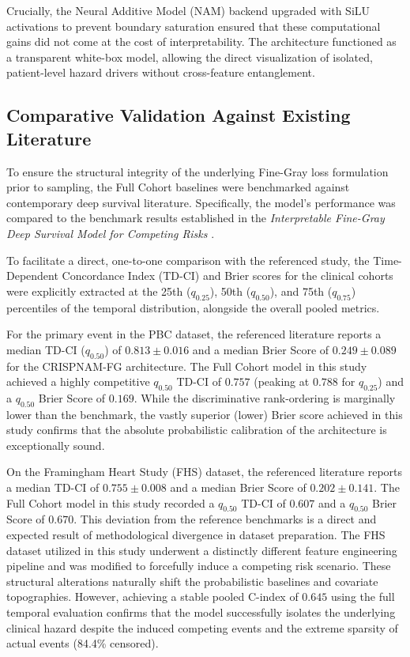 \documentclass[a4paper,twoside,12pt]{report}
\begin{document}
Crucially, the Neural Additive Model (NAM) backend upgraded with SiLU activations to prevent boundary saturation ensured that these computational gains did not come at the cost of interpretability. The architecture functioned as a transparent white-box model, allowing the direct visualization of isolated, patient-level hazard drivers without cross-feature entanglement.

\subsection{Comparative Validation Against Existing Literature}

To ensure the structural integrity of the underlying Fine-Gray loss formulation prior to sampling, the Full Cohort baselines were benchmarked against contemporary deep survival literature. Specifically, the model's performance was compared to the benchmark results established in the \textit{Interpretable Fine-Gray Deep Survival Model for Competing Risks} \citep{InterpretableFineGray2025}. 

To facilitate a direct, one-to-one comparison with the referenced study, the Time-Dependent Concordance Index (TD-CI) and Brier scores for the clinical cohorts were explicitly extracted at the 25th ($q_{0.25}$), 50th ($q_{0.50}$), and 75th ($q_{0.75}$) percentiles of the temporal distribution, alongside the overall pooled metrics.

For the primary event in the PBC dataset, the referenced literature reports a median TD-CI ($q_{0.50}$) of $0.813 \pm 0.016$ and a median Brier Score of $0.249 \pm 0.089$ for the CRISPNAM-FG architecture. The Full Cohort model in this study achieved a highly competitive $q_{0.50}$ TD-CI of $0.757$ (peaking at $0.788$ for $q_{0.25}$) and a $q_{0.50}$ Brier Score of $0.169$. While the discriminative rank-ordering is marginally lower than the benchmark, the vastly superior (lower) Brier score achieved in this study confirms that the absolute probabilistic calibration of the architecture is exceptionally sound. 

On the Framingham Heart Study (FHS) dataset, the referenced literature reports a median TD-CI of $0.755 \pm 0.008$ and a median Brier Score of $0.202 \pm 0.141$. The Full Cohort model in this study recorded a $q_{0.50}$ TD-CI of $0.607$ and a $q_{0.50}$ Brier Score of $0.670$. This deviation from the reference benchmarks is a direct and expected result of methodological divergence in dataset preparation. The FHS dataset utilized in this study underwent a distinctly different feature engineering pipeline and was modified to forcefully induce a competing risk scenario. These structural alterations naturally shift the probabilistic baselines and covariate topographies. However, achieving a stable pooled C-index of $0.645$ using the full temporal evaluation confirms that the model successfully isolates the underlying clinical hazard despite the induced competing events and the extreme sparsity of actual events (84.4\% censored).
\end{document}
